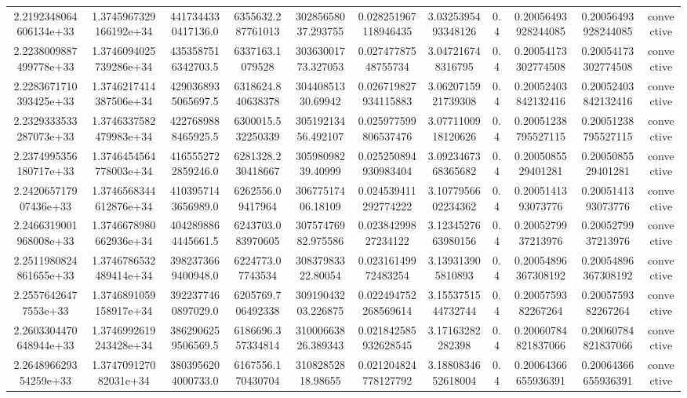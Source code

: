 \begin{table}
\begin{tabular}{ccccccccccc}
2.2192348064606134e+33 & 1.3745967329166192e+34 & 4417344330417136.0 & 6355632.287761013 & 30285658037.293755 & 0.028251967118946435 & 3.0325395493348126 & 0.4 & 0.20056493928244085 & 0.20056493928244085 & convective \\
2.2238009887499778e+33 & 1.3746094025739286e+34 & 4353587516342703.5 & 6337163.1079528 & 30363001773.327053 & 0.02747787548755734 & 3.047216748316795 & 0.4 & 0.20054173302774508 & 0.20054173302774508 & convective \\
2.2283671710393425e+33 & 1.3746217414387506e+34 & 4290368935065697.5 & 6318624.840638378 & 30440851330.69942 & 0.026719827934115883 & 3.0620715921739308 & 0.4 & 0.20052403842132416 & 0.20052403842132416 & convective \\
2.2329333533287073e+33 & 1.3746337582479983e+34 & 4227689888465925.5 & 6300015.532250339 & 30519213456.492107 & 0.025977599806537476 & 3.0771100918120626 & 0.4 & 0.20051238795527115 & 0.20051238795527115 & convective \\
2.2374995356180717e+33 & 1.3746454564778003e+34 & 4165552722859246.0 & 6281328.230418667 & 30598098239.40999 & 0.025250894930983404 & 3.0923467368365682 & 0.4 & 0.2005085529401281 & 0.2005085529401281 & convective \\
2.242065717907436e+33 & 1.3746568344612876e+34 & 4103957143656989.0 & 6262556.09417964 & 30677517406.18109 & 0.024539411292774222 & 3.1077956602234362 & 0.4 & 0.2005141393073776 & 0.2005141393073776 & convective \\
2.2466319001968008e+33 & 1.3746678980662936e+34 & 4042898864445661.5 & 6243703.083970605 & 30757476982.975586 & 0.02384299827234122 & 3.1234527663980156 & 0.4 & 0.2005279937213976 & 0.2005279937213976 & convective \\
2.2511980824861655e+33 & 1.3746786532489414e+34 & 3982373669400948.0 & 6224773.07743534 & 30837983322.80054 & 0.02316149972483254 & 3.139313905810893 & 0.4 & 0.20054896367308192 & 0.20054896367308192 & convective \\
2.25576426477553e+33 & 1.3746891059158917e+34 & 3922377460897029.0 & 6205769.706492338 & 30919043203.226875 & 0.022494752268569614 & 3.1553751544732744 & 0.4 & 0.2005759382267264 & 0.2005759382267264 & convective \\
2.2603304470648944e+33 & 1.3746992619243428e+34 & 3862906259506569.5 & 6186696.357334814 & 31000663826.389343 & 0.021842585932628545 & 3.17163282282398 & 0.4 & 0.20060784821837066 & 0.20060784821837066 & convective \\
2.264896629354259e+33 & 1.374709127082031e+34 & 3803956204000733.0 & 6167556.170430704 & 31082852818.98655 & 0.021204824778127792 & 3.1880834652618004 & 0.4 & 0.20064366655936391 & 0.20064366655936391 & convective \\

\end{tabular}
\end{table}

